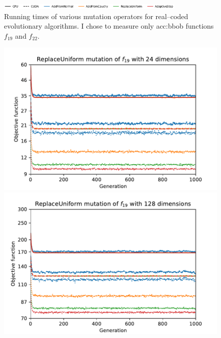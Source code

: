 \begin{figure}[ht!]
    \begin{minipage}{\textwidth}
        \centering
        \includegraphics[width=0.8\textwidth]{img/runs/time_es_mutation_legend.pdf}
    \end{minipage}

    \caption[Running times of mutation operators]{Running times of various mutation operators for real--coded evolutionary algorithms. I chose to measure only \acrshort{acc:bbob} functions $f_{19}$ and $f_{22}$. }
\end{figure}



\begin{figure}[ht!]
    \begin{minipage}[t]{0.32\textwidth}
        \centering
        \includegraphics[width=\textwidth]{img/runs/fitness_es_mutation_f19_dim24_ReplaceUniform.pdf}
    \end{minipage}
    \hfill
    \begin{minipage}[t]{0.32\textwidth}
        \centering
        \includegraphics[width=\textwidth]{img/runs/fitness_es_mutation_f19_dim128_ReplaceUniform.pdf}

\end{minipage}
\end{figure}
